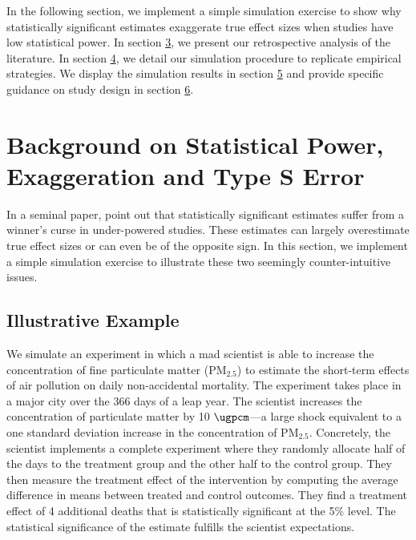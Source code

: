 \documentclass[12pt]{article}
\renewcommand{\thefootnote}{\fnsymbol{footnote}}
\begin{document}
    In the following section, we implement a simple simulation exercise to show why statistically significant estimates exaggerate true effect sizes when studies have low statistical power. In section \hyperlink{section.3}{3}, we present our retrospective analysis of the literature. In section \hyperlink{section.4}{4}, we detail our simulation procedure to replicate empirical strategies. We display the simulation results in section \hyperlink{section.5}{5} and provide specific guidance on study design in section \hyperlink{section.6}{6}.
    




\section{Background on Statistical Power, Exaggeration and Type S Error}

    In a seminal paper, \cite{gelman_beyond_2014} point out that statistically significant estimates suffer from a winner's curse in under-powered studies. These estimates can largely overestimate true effect sizes or can even be of the opposite sign. In this section, we implement a simple simulation exercise to illustrate these two seemingly counter-intuitive issues. 

    \subsection{Illustrative Example}
    
    \renewcommand*{\thefootnote}{\arabic{footnote}}
    \setcounter{footnote}{0}

    We simulate an experiment in which a mad scientist is able to increase the concentration of fine particulate matter (PM$_{2.5}$) to estimate the short-term effects of air pollution on daily non-accidental mortality. The experiment takes place in a major city over the 366 days of a leap year. The scientist increases the concentration of particulate matter by 10 $\si{\ugpcm}$---a large shock equivalent to a one standard deviation increase in the concentration of PM$_{2.5}$. Concretely, the scientist implements a complete experiment where they randomly allocate half of the days to the treatment group and the other half to the control group. They then measure the treatment effect of the intervention by computing the average difference in means between treated and control outcomes. They find a treatment effect of 4 additional deaths that is statistically significant at the 5\% level. The statistical significance of the estimate fulfills the scientist expectations.
    
\end{document}
